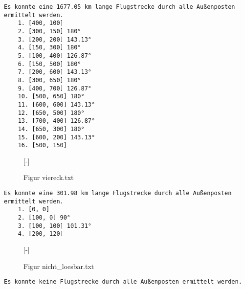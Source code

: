 \documentclass[a4paper,10pt,ngerman]{scrartcl}
\begin{document}
    \begin{lstlisting}[frame=single, title=Programmausgabe kreis.txt, breaklines=true,label={lst:lstlisting}]
    Es konnte eine 1677.05 km lange Flugstrecke durch alle Außenposten ermittelt werden.
    1. [400, 100]
    2. [300, 150] 180°
    3. [200, 200] 143.13°
    4. [150, 300] 180°
    5. [100, 400] 126.87°
    6. [150, 500] 180°
    7. [200, 600] 143.13°
    8. [300, 650] 180°
    9. [400, 700] 126.87°
    10. [500, 650] 180°
    11. [600, 600] 143.13°
    12. [650, 500] 180°
    13. [700, 400] 126.87°
    14. [650, 300] 180°
    15. [600, 200] 143.13°
    16. [500, 150]
    \end{lstlisting}


    \begin{figure}[H]
        [-]
        \FigurFuenf{}
        \caption{Figur viereck.txt}
        \label{fig:Figure3}
    \end{figure}

    \begin{lstlisting}[frame=single, title=Programmausgabe viereck.txt, breaklines=true,label={lst:lstlisting3}]
    Es konnte eine 301.98 km lange Flugstrecke durch alle Außenposten ermittelt werden.
    1. [0, 0]
    2. [100, 0] 90°
    3. [100, 100] 101.31°
    4. [200, 120]
    \end{lstlisting}


    \begin{figure}[H]
        [-]
        \FigurFuenf{}
        \caption{Figur nicht\_loesbar.txt}
        \label{fig:Figure3}
    \end{figure}

    \begin{lstlisting}[frame=single, title=Programmausgabe nicht\_loesbar.txt, breaklines=true,label={lst:lstlisting4}]
    Es konnte keine Flugstrecke durch alle Außenposten ermittelt werden.
    \end{lstlisting}
\end{document}
